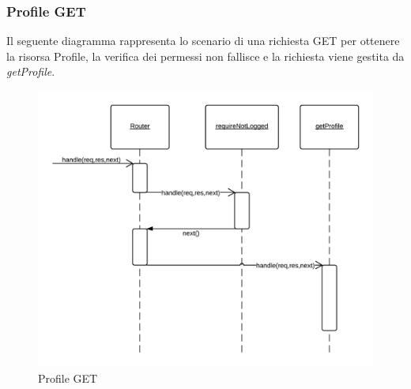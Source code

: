 \subsubsection{Profile GET} 
Il seguente diagramma rappresenta lo scenario di una richiesta GET per ottenere la risorsa Profile, la verifica dei permessi non fallisce e la richiesta viene gestita da \emph{getProfile}.
\begin{figure}[H]
	\begin{center} 
		\includegraphics[scale=0.20]{scenari/Profile GET.png} 
		\caption{Profile GET}
	\end{center} 
\end{figure}

